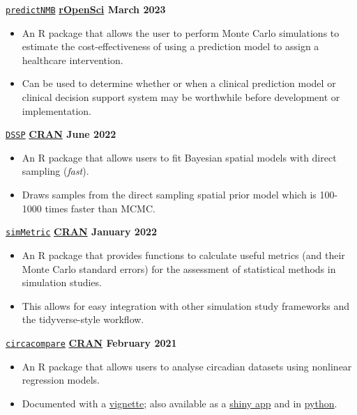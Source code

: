 \texttt{\href{https://github.com/ropensci/predictNMB}{predictNMB}} \hfill \textbf{\href{https://docs.ropensci.org/predictNMB/}{rOpenSci} March 2023} \par
\begin{itemize}
    \item An R package that allows the user to perform Monte Carlo simulations to estimate the cost-effectiveness of using a prediction model to assign a healthcare intervention.
    \item Can be used to determine whether or when a clinical prediction model or clinical decision support system may be worthwhile before development or implementation.
\end{itemize}

\texttt{\href{https://github.com/gentrywhite/DSSP}{DSSP}} \hfill \textbf{\href{https://cran.r-project.org/package=DSSP}{CRAN} June 2022} \par
\begin{itemize}
    \item An R package that allows users to fit Bayesian spatial models with direct sampling (\textit{fast}).
    \item Draws samples from the direct sampling spatial prior model which is 100-1000 times faster than MCMC.
\end{itemize}

\texttt{\href{https://github.com/RWParsons/simMetric}{simMetric}} \hfill \textbf{\href{https://cran.r-project.org/package=simMetric}{CRAN}  January 2022} \par
\begin{itemize}
    \item An R package that provides functions to calculate useful metrics (and their Monte Carlo standard errors) for the assessment of statistical methods in simulation studies.
    \item This allows for easy integration with other simulation study frameworks and the tidyverse-style workflow.
\end{itemize}

\texttt{\href{https://github.com/RWParsons/circacompare}{circacompare}} \hfill \textbf{\href{https://cran.r-project.org/package=circacompare}{CRAN} February 2021} \par
\begin{itemize}
    \item An R package that allows users to analyse circadian datasets using nonlinear regression models.
    \item Documented with a \href{https://cran.r-project.org/web/packages/circacompare/vignettes/circacompare-vignette.html}{vignette}; also available as a \href{https://rwparsons.shinyapps.io/circacompare/}{shiny app} and in \href{https://github.com/RWParsons/circacompare_py}{python}.
\end{itemize}

